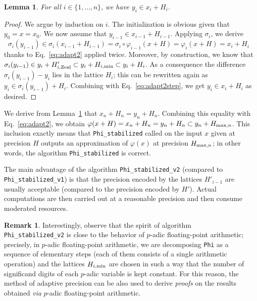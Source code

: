 \documentclass[11pt]{article}
\numberwithin{equation}{section}
\numberwithin{figure}{section}
\newtheorem{lem}[theo]{Lemma}
\theoremstyle{definition}
\newtheorem{rem}[theo]{Remark}
\renewcommand{\min}{\text{\rm min}}
\renewcommand{\max}{\text{\rm max}}
\newcommand{\zealous}{\text{\rm Zeal}}
\begin{document}
\begin{lem}
\label{lem:adaptcorrect}
For all $i \in \{1,\ldots,n\}$, we have $y_i \in x_i + H_i$.
\end{lem}

\begin{proof}
We argue by induction on $i$. The initialization is obvious given that 
$y_0 = x = x_0$. We now assume that $y_{i-1} \in x_{i-1} + H_{i-1}$. 
Applying $\sigma_i$, we derive
\begin{equation}
\label{eq:adapt2step}
\sigma_i(y_{i-1}) \in \sigma_i(x_{i-1} + H_{i-1}) = 
\sigma_i \circ \varphi_{i-1}(x + H) = \varphi_i (x+H) = x_i + H_i
\end{equation}
thanks to Eq.~\eqref{eq:adapt2} applied twice. Moreover, by
construction, we know that $\sigma_i(y_{i-1}) \in y_i + H'_{i,\zealous}
\subset y_i + H_{i,\min} \subset y_i + H_i$. As a consequence the
difference $\sigma_i(y_{i-1}) - y_i$ lies in the lattice $H_i$; this
can be rewritten again as $y_i \in \sigma_i(y_{i-1}) + H_i$. Combining
with Eq.~\eqref{eq:adapt2step}, we get $y_i \in x_i + H_i$ as desired.
\end{proof}

\noindent
We derive from Lemma~\ref{lem:adaptcorrect} that $x_n + H_n = y_n +
H_n$. Combining this equality with Eq.~\eqref{eq:adapt2}, we obtain
$\varphi(x+H) = x_n + H_n = y_n + H_n \subset y_n + H_{\max,n}$.
This inclusion exactly means that \texttt{Phi\_stabilized} called on 
the input $x$ given at precision $H$ outputs an approximation of 
$\varphi(x)$ at precision $H_{\max,n}$; in other words, the algorithm 
\texttt{Phi\_stabilized} is correct.

\smallskip

The main advantage of the algorithm \texttt{Phi\_stabilized\_v2} 
(compared to \texttt{Phi\_stabilized\_v1}) is that the precision encoded 
by the lattices $H'_{i-1}$ are usually acceptable (compared to the 
precision encoded by $H'$). Actual computations are then carried out
at a reasonable precision and then consume moderated resources.

\begin{rem}
Interestingly, observe that the spirit of algorithm 
\texttt{Phi\_stabilized\_v2} is close to the behavior of $p$-adic 
floating-point arithmetic; precisely, in $p$-adic floating-point 
arithmetic, we are decomposing \texttt{Phi} as a sequence of elementary 
steps (each of them consists of a single arithmetic operation) and the 
lattices $H_{i,\min}$ are chosen in such a way that the number of 
significand digits of each $p$-adic variable is kept constant. For 
this reason, the method of adaptive precision can be also used to 
derive \emph{proofs} on the results obtained \emph{via} $p$-adic 
floating-point arithmetic.
\end{rem}
\end{document}
